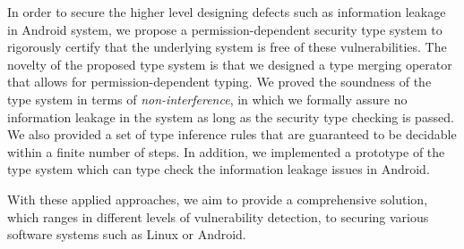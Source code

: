 In order to secure the higher level designing defects such as information leakage in Android system, we propose a permission-dependent security type system to rigorously certify that the underlying system is free of these vulnerabilities. The novelty of the proposed type system is that we designed a type merging operator that allows for permission-dependent typing. We proved the soundness of the type system in terms of \emph{non-interference}, in which we formally assure no information leakage in the system as long as the security type checking is passed. We also provided a set of type inference rules that are guaranteed to be decidable within a finite number of steps. In addition, we implemented a prototype of the type system which can type check the information leakage issues in Android.

With these applied approaches, we aim to provide a comprehensive solution, which ranges in different levels of vulnerability detection, to securing various software systems such as Linux or Android.

